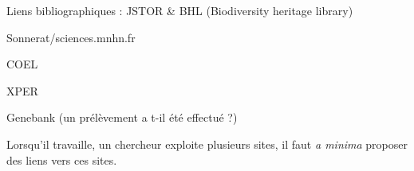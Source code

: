 \startchapter[title={Liens vers des outils tiers}]

\startTODO
\startitemize
	\item Liens bibliographiques : JSTOR & BHL (Biodiversity heritage library)
	\item Sonnerat/sciences.mnhn.fr
	\item COEL
	\item XPER
	\item Genebank (un prélèvement a t-il été effectué ?)
	\item Lorsqu'il travaille, un chercheur exploite plusieurs sites, il faut {\it a minima} proposer des liens vers ces sites.
\stopitemize
\stopTODO